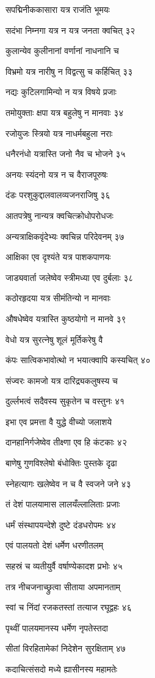 सपद्मिनीककासारा यत्र राजंति भूमयः

सदंभा निम्नगा यत्र न यत्र जनता क्वचित् ३२

कुलान्येव कुलीनानां वर्णानां नाधनानि च

विभ्रमो यत्र नारीषु न विद्वत्सु च कर्हिचित् ३३

नद्यः कुटिलगामिन्यो न यत्र विषये प्रजाः

तमोयुक्ताः क्षपा यत्र बहुलेषु न मानवाः ३४

रजोयुजः स्त्रियो यत्र नाधर्मबहुला नराः

धनैरनंधो यत्रास्ति जनो नैव च भोजने ३५

अनयः स्यंदनो यत्र न च वैराजपूरुषः

दंडः परशुकुद्दालवालव्यजनराजिषु ३६

आतपत्रेषु नान्यत्र क्वचित्क्रोधोपरोधजः

अन्यत्राक्षिकवृंदेभ्यः क्वचिन्न परिदेवनम् ३७

आक्षिका एव दृश्यंते यत्र पाशकपाणयः

जाड्यवार्ता जलेष्वेव स्त्रीमध्या एव दुर्बलाः ३८

कठोरहृदया यत्र सीमंतिन्यो न मानवाः

औषधेष्वेव यत्रास्ति कुष्ठयोगो न मानवे ३९

वेधो यत्र सुरत्नेषु शूलं मूर्तिकरेषु वै

कंपः सात्विकभावोत्थो न भयात्क्वापि कस्यचित् ४०

संज्वरः कामजो यत्र दारिद्र्यकलुषस्य च

दुर्ल्लभत्वं सदैवस्य सुकृतेन च वस्तुनः ४१

इभा एव प्रमत्ता वै युद्धे वीच्यो जलाशये

दानहानिर्गजेष्वेव तीक्ष्णा एव हि कंटकाः ४२

बाणेषु गुणविश्लेषो बंधोक्तिः पुस्तके दृढा

स्नेहत्यागः खलेष्वेव न च वै स्वजने जने ४३

तं देशं पालयामास लालयँल्लालिताः प्रजाः

धर्मं संस्थापयन्देशे दुष्टे दंडधरोपमः ४४

एवं पालयतो देशं धर्मेण धरणीतलम्

सहस्रं च व्यतीयुर्वै वर्षाण्येकादश प्रभोः ४५

तत्र नीचजनाच्छ्रुत्वा सीताया अपमानताम्

स्वां च निंदां रजकतस्तां तत्याज रघूद्वहः ४६

पृथ्वीं पालयमानस्य धर्मेण नृपतेस्तदा

सीतां विरहितामेकां निदेशेन सुरक्षिताम् ४७

कदाचित्संसदो मध्ये ह्यासीनस्य महामतेः

